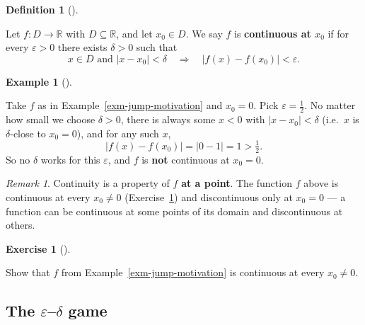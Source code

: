 \documentclass[
  letterpaper,
  DIV=11,
  numbers=noendperiod]{scrreprt}
\theoremstyle{plain}
\theoremstyle{plain}
\theoremstyle{definition}
\newtheorem{definition}{Definition}[chapter]
\theoremstyle{definition}
\newtheorem{exercise}{Exercise}[chapter]
\theoremstyle{definition}
\newtheorem{example}{Example}[chapter]
\theoremstyle{plain}
\theoremstyle{plain}
\theoremstyle{remark}
\newtheorem{refremark}{Remark}[chapter]
\begin{document}
\begin{definition}[]\protect\hypertarget{def-continuity}{}\label{def-continuity}

\hfill\break
Let \(f\colon D\to\mathbb{R}\) with \(D\subseteq\mathbb{R}\), and let
\(x_0\in D\). We say \(f\) is \textbf{continuous at \(x_0\)} if for
every \(\varepsilon>0\) there exists \(\delta>0\) such that \[
x\in D \text{ and } \lvert x-x_0 \rvert<\delta \quad \Rightarrow \quad\lvert f(x)-f(x_0) \rvert<\varepsilon.
\]

\end{definition}

\begin{example}[]\protect\hypertarget{exm-jump-not-continuous}{}\label{exm-jump-not-continuous}

\hfill\break
Take \(f\) as in Example~\ref{exm-jump-motivation} and \(x_0=0\). Pick
\(\varepsilon=\tfrac12\). No matter how small we choose \(\delta>0\),
there is always some \(x<0\) with \(\lvert x-x_0 \rvert<\delta\)
(i.e.~\(x\) is \(\delta\)-close to \(x_0=0\)), and for any such \(x\),
\[
\lvert f(x)-f(x_0) \rvert = \lvert 0-1 \rvert = 1 > \tfrac12.
\] So no \(\delta\) works for this \(\varepsilon\), and \(f\) is
\textbf{not} continuous at \(x_0=0\).

\end{example}

\begin{refremark}
Continuity is a property of \(f\) \textbf{at a point}. The function
\(f\) above is continuous at every \(x_0\neq 0\)
(Exercise~\ref{exr-jump-continuous-elsewhere}) and discontinuous only at
\(x_0=0\) --- a function can be continuous at some points of its domain
and discontinuous at others.

\label{rem-continuity-at-a-point}

\end{refremark}

\begin{exercise}[]\protect\hypertarget{exr-jump-continuous-elsewhere}{}\label{exr-jump-continuous-elsewhere}

Show that \(f\) from Example~\ref{exm-jump-motivation} is continuous at
every \(x_0\neq 0\).

\end{exercise}

\subsection{\texorpdfstring{The \(\varepsilon\)--\(\delta\)
game}{The \textbackslash varepsilon--\textbackslash delta game}}\label{the-varepsilondelta-game}
\end{document}
